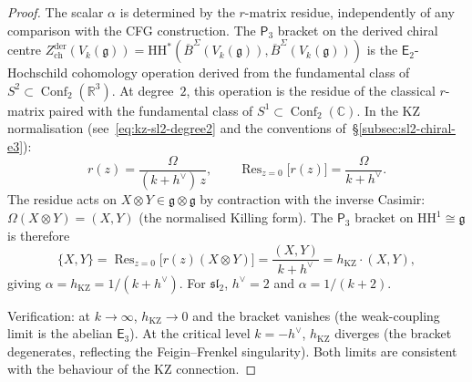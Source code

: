 \documentclass[11pt,reqno]{amsart}
\theoremstyle{definition}
\theoremstyle{remark}
\newcommand{\HH}{\mathrm{HH}}
\newcommand{\Etwo}{\mathsf{E}_{2}}
\newcommand{\Ethree}{\mathsf{E}_{3}}
\newcommand{\Pthree}{\mathsf{P}_{3}}
\DeclareMathOperator{\Conf}{Conf}
\newcommand{\fg}{\mathfrak{g}}
\newcommand{\BarSig}{\overline{B}^{\Sigma}}
\newcommand{\CC}{\mathbb{C}}
\newcommand{\RR}{\mathbb{R}}
\numberwithin{equation}{section}
\begin{document}
\begin{proof}
The scalar $\alpha$ is determined by the $r$-matrix
residue, independently of any comparison with the CFG
construction. The $\Pthree$ bracket on the derived
chiral centre $Z^{\mathrm{der}}_{\mathrm{ch}}(V_k(\fg))
= \HH^*(\BarSig(V_k(\fg)), \BarSig(V_k(\fg)))$ is the
$\Etwo$-Hochschild cohomology operation derived from
the fundamental class of $S^2 \subset \Conf_2(\RR^3)$.
At degree~$2$, this operation is the residue of the
classical $r$-matrix paired with the fundamental class
of $S^1 \subset \Conf_2(\CC)$. In the KZ normalisation
(see~\eqref{eq:kz-sl2-degree2} and the conventions
of~\S\ref{subsec:sl2-chiral-e3}):
\begin{equation}\label{eq:p3-from-r-matrix-residue}
  r(z) = \frac{\Omega}{(k + h^\vee)\,z},
  \qquad
  \operatorname{Res}_{z=0}\bigl[r(z)\bigr]
  = \frac{\Omega}{k + h^\vee}.
\end{equation}
The residue acts on $X \otimes Y \in \fg \otimes \fg$
by contraction with the inverse Casimir:
$\Omega(X \otimes Y) = (X, Y)$ (the normalised Killing
form). The $\Pthree$ bracket on $\HH^1 \cong \fg$ is
therefore
\begin{equation}\label{eq:p3-bracket-normalisation}
  \{X, Y\}
  = \operatorname{Res}_{z=0}
  \bigl[r(z)(X \otimes Y)\bigr]
  = \frac{(X, Y)}{k + h^\vee}
  = h_{\mathrm{KZ}} \cdot (X, Y),
\end{equation}
giving $\alpha = h_{\mathrm{KZ}} = 1/(k + h^\vee)$.
For $\mathfrak{sl}_2$, $h^\vee = 2$ and
$\alpha = 1/(k + 2)$.

Verification: at $k \to \infty$,
$h_{\mathrm{KZ}} \to 0$ and the bracket vanishes (the
weak-coupling limit is the abelian $\Ethree$). At the
critical level $k = -h^\vee$, $h_{\mathrm{KZ}}$ diverges
(the bracket degenerates, reflecting the Feigin--Frenkel
singularity). Both limits are consistent with
the behaviour of the KZ connection.


\end{proof}
\end{document}
